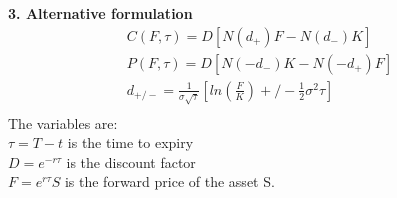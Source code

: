 \documentclass[a4paper]{article}
\begin{document}
{\bf 3. Alternative formulation}
\begin{align*}
	C(F,\tau)= D[N(d_+)F - N(d_-)K] \\
	P(F,\tau)= D[N(-d_-)K - N(-d_+)F] \\
	d_{+/-} = \frac{1}{\sigma \sqrt{\tau}}[ln(\frac{F}{K})+/-\frac{1}{2}\sigma^2 \tau] \\
\end{align*}
The variables are:\\
$\tau = T - t$ is the time to expiry\\
$D = e^{-r\tau}$ is the discount factor \\
$F = e^{r\tau} S$ is the forward price of the asset S.
\end{document}
